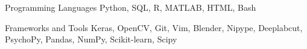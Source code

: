 

\begin{cvskills}

 \cvskill
  	{Programming Languages}
    {Python, SQL, R, MATLAB, HTML, Bash} %
  
 \cvskill
   {Frameworks and Tools}
   {Keras, OpenCV, Git, Vim, Blender, Nipype, Deeplabcut, PsychoPy, Pandas, NumPy, Scikit-learn, Scipy}
   
   
    

\end{cvskills}
